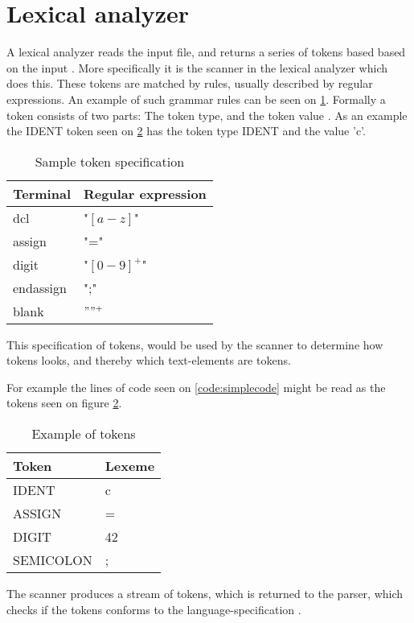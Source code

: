 \section{Lexical analyzer}
A lexical analyzer reads the input file, and returns a series of tokens based based on the input \citep{CraftingACompiler}. More specifically it is the scanner in the lexical analyzer which does this. These tokens are matched by rules, usually described by regular expressions. An example of such grammar rules can be seen on \ref{tab:tokenspecification}. Formally a token consists of two parts: The token type, and the token value \citep{CraftingACompiler}. As an example the IDENT token seen on \ref{tab:tokensexample} has the token type IDENT and the value 'c'. 

\begin{table}[H]
\begin{tabular}{|l|l|}
\hline
    	Terminal  	& Regular expression 	\\ \hline
    	dcl       	& "$[a-z]$"      			\\ 
    	assign    	& "="      				\\ 
    	digit     	& "$[0-9]^+$"   			\\ 
    	endassign 	& ";"      				\\
    	blank 		& $" "^+$					\\
    \hline
\end{tabular}
\caption{Sample token specification}
\label{tab:tokenspecification}
\end{table}
This specification of tokens, would be used by the scanner to determine how tokens looks, and thereby which text-elements are tokens. 


For example the lines of code seen on \ref{code:simplecode} might be read as the tokens seen on figure \ref{tab:tokensexample}.
\begin{table}[H]
\begin{tabular}{|l|l|}
\hline
    Token     & Lexeme \\ \hline
    IDENT     & c      \\ 
    ASSIGN    & =      \\ 
    DIGIT     & 42     \\ 
    SEMICOLON & ;      \\
    \hline
\end{tabular}
\caption{Example of tokens}
\label{tab:tokensexample}
\end{table}
The scanner produces a stream of tokens, which is returned to the parser, which checks if the tokens conforms to the language-specification \citep{CraftingACompiler}.